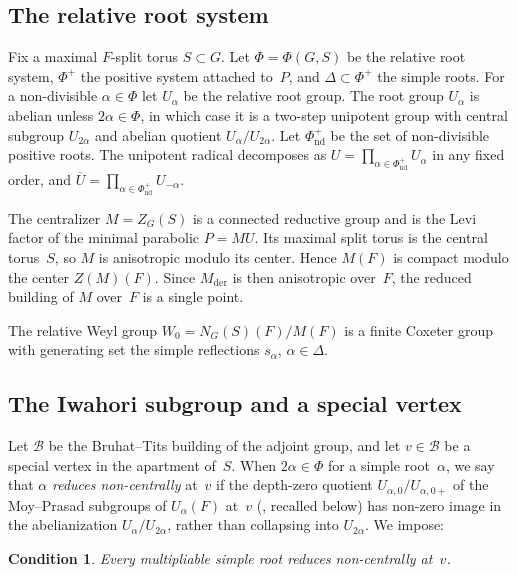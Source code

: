 \documentclass[11pt]{amsart}
\newtheorem{condition}[theorem]{Condition}
\theoremstyle{definition}
\theoremstyle{remark}
\newcommand{\barr}[1]{\overline{#1}}
\begin{document}
\subsection{The relative root system}\label{ssec:structure}

Fix a maximal $F$-split torus $S \subset G$. Let $\Phi = \Phi(G,S)$ be the relative root system, $\Phi^+$ the positive system attached to~$P$, and $\Delta \subset \Phi^+$ the simple roots. For a non-divisible $\alpha \in \Phi$ let $U_\alpha$ be the relative root group. The root group $U_\alpha$ is abelian unless $2\alpha \in \Phi$, in which case it is a two-step unipotent group with central subgroup $U_{2\alpha}$ and abelian quotient $U_\alpha/U_{2\alpha}$. Let $\Phi^+_{\mathrm{nd}}$ be the set of non-divisible positive roots. The unipotent radical decomposes as $U = \prod_{\alpha \in \Phi^+_{\mathrm{nd}}} U_\alpha$ in any fixed order, and $\barr{U} = \prod_{\alpha \in \Phi^+_{\mathrm{nd}}} U_{-\alpha}$. 

The centralizer $M = Z_G(S)$ is a connected reductive group and is the Levi factor of the minimal parabolic $P = MU$. Its maximal split torus is the central torus~$S$, so $M$ is anisotropic modulo its center. Hence $M(F)$ is compact modulo the center $Z(M)(F)$. Since $M_{\mathrm{der}}$ is then anisotropic over~$F$, the reduced building of $M$ over~$F$ is a single point.

The relative Weyl group $W_0 = N_G(S)(F)/M(F)$ is a finite Coxeter group with generating set the simple reflections $s_\alpha$, $\alpha \in \Delta$.


\subsection{The Iwahori subgroup and a special vertex}\label{ssec:Iwahori}

Let $\mathcal{B}$ be the Bruhat--Tits building of the adjoint group, and let $v \in \mathcal{B}$ be a special vertex in the apartment of~$S$. When $2\alpha\in\Phi$ for a simple root~$\alpha$, we say that $\alpha$ \emph{reduces non-centrally} at~$v$ if the depth-zero quotient $U_{\alpha,0}/U_{\alpha,0+}$ of the Moy--Prasad subgroups of $U_\alpha(F)$ at~$v$ (\cite{MoyPrasad94}, recalled below) has non-zero image in the abelianization $U_\alpha/U_{2\alpha}$, rather than collapsing into $U_{2\alpha}$. We impose:

\begin{condition}\label{cond:noncentral}
Every multipliable simple root reduces non-centrally at~$v$.
\end{condition}
\end{document}
